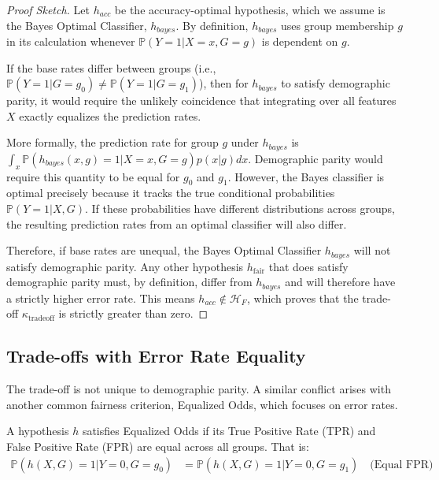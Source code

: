 \begin{proof}[Proof Sketch]
Let $h_{acc}$ be the accuracy-optimal hypothesis, which we assume is the Bayes Optimal Classifier, $h_{bayes}$. By definition, $h_{bayes}$ uses group membership $g$ in its calculation whenever $\mathbb{P}(Y=1 | X=x, G=g)$ is dependent on $g$.

If the base rates differ between groups (i.e., $\mathbb{P}(Y=1|G=g_0) \neq \mathbb{P}(Y=1|G=g_1)$), then for $h_{bayes}$ to satisfy demographic parity, it would require the unlikely coincidence that integrating over all features $X$ exactly equalizes the prediction rates. 

More formally, the prediction rate for group $g$ under $h_{bayes}$ is $\int_x \mathbb{P}(h_{bayes}(x,g)=1 | X=x, G=g) p(x|g) dx$. Demographic parity would require this quantity to be equal for $g_0$ and $g_1$. However, the Bayes classifier is optimal precisely because it tracks the true conditional probabilities $\mathbb{P}(Y=1|X,G)$. If these probabilities have different distributions across groups, the resulting prediction rates from an optimal classifier will also differ.

Therefore, if base rates are unequal, the Bayes Optimal Classifier $h_{bayes}$ will not satisfy demographic parity. Any other hypothesis $h_{\text{fair}}$ that does satisfy demographic parity must, by definition, differ from $h_{bayes}$ and will therefore have a strictly higher error rate. This means $h_{acc} \notin \mathcal{H}_F$, which proves that the trade-off $\kappa_{\text{tradeoff}}$ is strictly greater than zero.
\end{proof}

\subsection{Trade-offs with Error Rate Equality}

The trade-off is not unique to demographic parity. A similar conflict arises with another common fairness criterion, Equalized Odds, which focuses on error rates.

\begin{definition}
A hypothesis $h$ satisfies Equalized Odds if its True Positive Rate (TPR) and False Positive Rate (FPR) are equal across all groups. That is:
\begin{align}
\mathbb{P}(h(X,G)=1 | Y=0, G=g_0) &= \mathbb{P}(h(X,G)=1 | Y=0, G=g_1) \quad \text{(Equal FPR)}
\end{align}
\end{definition}

